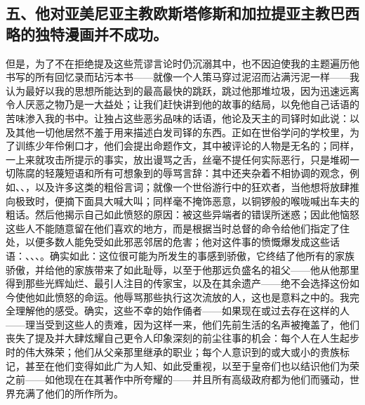 
\subsection{五、他对亚美尼亚主教欧斯塔修斯和加拉提亚主教巴西略的独特漫画并不成功。}

但是，为了不在拒绝提及这些荒谬言论时仍沉溺其中，也不因迫使我的主题遍历他书写的所有回忆录而玷污本书——就像一个人策马穿过泥沼而沾满污泥一样——我认为最好以我的思想所能达到的最高最快的跳跃，跳过他那堆垃圾，因为迅速远离令人厌恶之物乃是一大益处；让我们赶快讲到他的故事的结局，以免他自己话语的苦味渗入我的书中。让独占这些恶劣品味的话语，他论及天主的司铎时如此说：以及其他一切他居然不羞于用来描述白发司铎的东西。正如在世俗学问的学校里，为了训练少年伶俐口才，他们会提出命题作文，其中被评论的人物是无名的；同样，一上来就攻击所提示的事实，放出谩骂之舌，丝毫不提任何实际恶行，只是堆砌一切陈腐的轻蔑短语和所有可想象到的辱骂言辞：其中还夹杂着不相协调的观念，例如、、，以及许多这类的粗俗言词；就像一个世俗游行中的狂欢者，当他想将放肆推向极致时，便摘下面具大喊大叫；同样毫不掩饰恶意，以铜锣般的喉咙喊出车夫的粗话。然后他揭示自己如此愤怒的原因：被这些异端者的错误所迷惑；因此他恼怒这些人不能随意留在他们喜欢的地方，而是根据当时总督的命令给他们指定了住处，以便多数人能免受如此邪恶邻居的危害；他对这件事的愤慨爆发成这些话语：、、、。确实如此：这位很可能为所发生的事感到骄傲，它终结了他所有的家族骄傲，并给他的家族带来了如此耻辱，以至于他那远负盛名的祖父——他从他那里得到那些光辉灿烂、最引人注目的传家宝，以及在其余遗产——绝不会选择这份如今使他如此愤怒的命运。他辱骂那些执行这次流放的人，这也是意料之中的。我完全理解他的感受。确实，这些不幸的始作俑者——如果现在或过去存在这样的人——理当受到这些人的责难，因为这样一来，他们先前生活的名声被掩盖了，他们丧失了提及并大肆炫耀自己更令人印象深刻的前尘往事的机会：每个人在人生起步时的伟大殊荣；他们从父亲那里继承的职业；每个人意识到的或大或小的贵族标记，甚至在他们变得如此广为人知、如此受重视，以至于皇帝们也以结识他们为荣之前——如他现在在其著作中所夸耀的——并且所有高级政府都为他们而骚动，世界充满了他们的所作所为。\par

